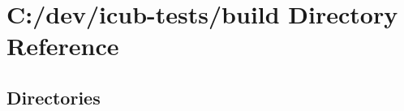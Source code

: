 \section{C\+:/dev/icub-\/tests/build Directory Reference}
\label{dir_4fef79e7177ba769987a8da36c892c5f}
\subsection*{Directories}
\begin{DoxyCompactItemize}
\end{DoxyCompactItemize}
